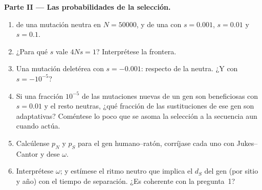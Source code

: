 \begin{problem}
\medskip
\noindent\textbf{Parte II --- Las probabilidades de la selección.}
\begin{enumerate}[resume]
  \item {} de una mutación neutra en
        $N = \num{50000}$, y de una con $s = 0.001$, $s = 0.01$ y
        $s = 0.1$.
  \item ¿Para qué $s$ vale $4Ns = 1$? Interprétese la frontera.
  \item Una mutación deletérea con $s = -0.001$: 
        respecto de la neutra. ¿Y con $s = -10^{-5}$?
  \item Si una fracción $10^{-5}$ de las mutaciones nuevas de un gen son
        beneficiosas con $s = 0.01$ y el resto neutras, ¿qué fracción de
        las sustituciones de ese gen son adaptativas? Coméntese lo poco
        que se asoma la selección a la secuencia aun cuando actúa.
  \item Calcúlense $p_{N}$ y $p_{S}$ para el gen humano--ratón,
        corríjase cada uno con Jukes--Cantor y dese $\omega$.
  \item Interprétese $\omega$; y estímese el ritmo neutro que implica el
        $d_{S}$ del gen (por sitio y año) con el tiempo de separación.
        ¿Es coherente con la pregunta~1?
\end{enumerate}


\end{problem}

